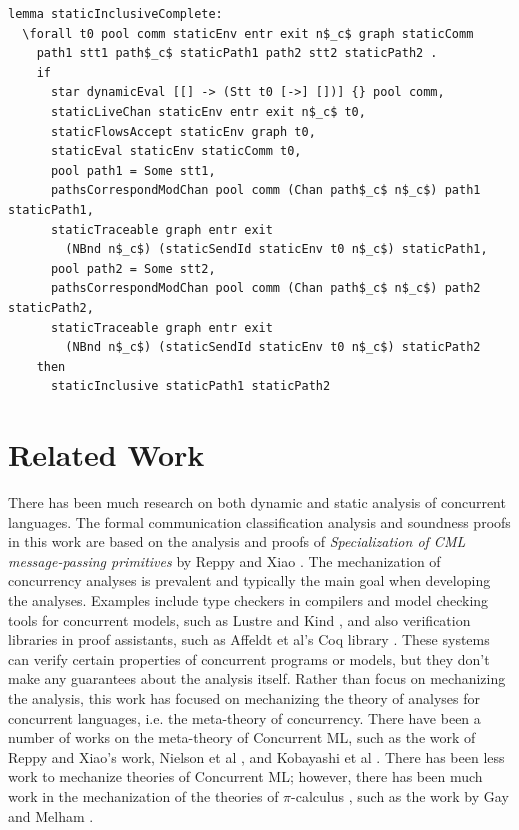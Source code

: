 \documentclass[10pt]{article}
\begin{document}
\begin{lstlisting}[language=logic, mathescape]
  lemma staticInclusiveComplete:
  \forall t0 pool comm staticEnv entr exit n$_c$ graph staticComm
    path1 stt1 path$_c$ staticPath1 path2 stt2 staticPath2 .
    if
      star dynamicEval [[] -> (Stt t0 [->] [])] {} pool comm, 
      staticLiveChan staticEnv entr exit n$_c$ t0, 
      staticFlowsAccept staticEnv graph t0, 
      staticEval staticEnv staticComm t0, 
      pool path1 = Some stt1, 
      pathsCorrespondModChan pool comm (Chan path$_c$ n$_c$) path1 staticPath1, 
      staticTraceable graph entr exit
        (NBnd n$_c$) (staticSendId staticEnv t0 n$_c$) staticPath1, 
      pool path2 = Some stt2, 
      pathsCorrespondModChan pool comm (Chan path$_c$ n$_c$) path2 staticPath2, 
      staticTraceable graph entr exit
        (NBnd n$_c$) (staticSendId staticEnv t0 n$_c$) staticPath2
    then
      staticInclusive staticPath1 staticPath2
\end{lstlisting}

  



\section{Related Work}
There has been much research on both dynamic and static analysis of concurrent languages.  
The formal communication classification analysis and soundness proofs in this work are
based on the analysis and proofs of \textit{Specialization of CML message-passing primitives}
by Reppy and Xiao \cite{reppy2007specialization}.
The mechanization of concurrency analyses is prevalent and typically the main
goal when developing the analyses. Examples include type checkers in compilers and
model checking tools for concurrent models, such as Lustre \cite{halbwachs1991synchronous} and Kind \cite{kind},
and also verification libraries in proof assistants, such as Affeldt et al's Coq library \cite{affeldt2008coq}.
These systems can verify certain properties of concurrent programs or models, but they don't
make any guarantees about the analysis itself.
Rather than focus on mechanizing the analysis, this work has focused on
mechanizing the theory of analyses for concurrent languages, i.e. the meta-theory of concurrency.
There have been a number of works on the meta-theory of Concurrent ML,
such as the work of Reppy and Xiao's work, Nielson et al \cite{nielson1994higher}, and Kobayashi et al \cite{kobayashi1995static}.
There has been less work to mechanize theories of Concurrent ML; however,
there has been much work in the mechanization of the theories of $\pi$-calculus
\cite{milner1999communicating}, such as the work by Gay \cite{gay2001framework} and Melham \cite{melham1994mechanized}. 
\end{document}
